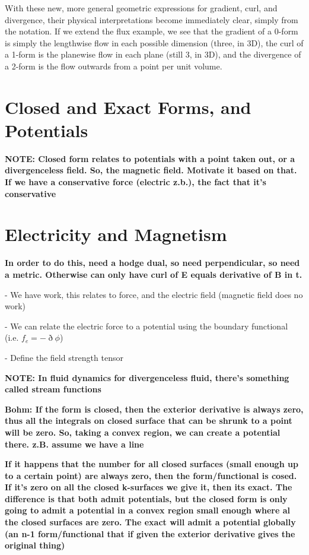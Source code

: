 \documentclass{book}
\begin{document}
With these new, more general geometric expressions for gradient, curl, and divergence, their physical interpretations become immediately clear, simply from the notation. If we extend the flux example, we see that the gradient of a 0-form is simply the lengthwise flow in each possible dimension (three, in 3D), the curl of a 1-form is the planewise flow in each plane (still 3, in 3D), and the divergence of a 2-form is the flow outwards from a point per unit volume. 



\section{Closed and Exact Forms, and Potentials}

\textbf{NOTE: Closed form relates to potentials with a point taken out, or a divergenceless field. So, the magnetic field. Motivate it based on that. If we have a conservative force (electric z.b.), the fact that it's conservative }



\section{Electricity and Magnetism}

\textbf{In order to do this, need a hodge dual, so need perpendicular, so need a metric. Otherwise can only have curl of E equals derivative of B in t. }

- We have work, this relates to force, and the electric field (magnetic field does no work)

- We can relate the electric force to a potential using the boundary functional (i.e. $f_e = -\eth\phi$)

- Define the field strength tensor


\textbf{NOTE: In fluid dynamics for divergenceless fluid, there's something called stream functions}

\textbf{Bohm: If the form is closed, then the exterior derivative is always zero, thus all the integrals on closed surface that can be shrunk to a point will be zero. So, taking a convex region, we can create a potential there. z.B. assume we have a line}

\textbf{If it happens that the number for all closed surfaces (small enough up to a certain point) are always zero, then the form/functional is cosed. If it's zero on all the closed k-surfaces we give it, then its exact. The difference is that both admit potentials, but the closed form is only going to admit a potential in a convex region small enough where al the closed surfaces are zero. The exact will admit a potential globally (an n-1 form/functional that if given the exterior derivative gives the original thing)}
\end{document}
